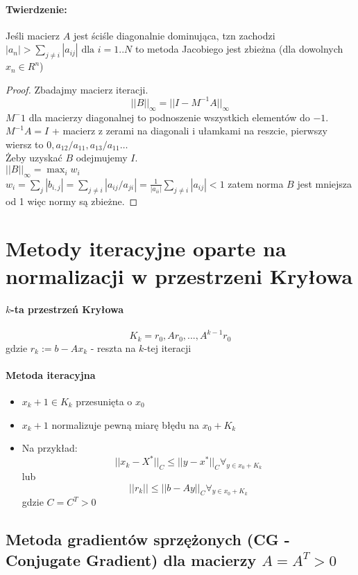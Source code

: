 \documentclass{article}
\begin{document}
\paragraph{Twierdzenie:} Jeśli macierz $ A $ jest ściśle diagonalnie dominująca, tzn zachodzi
$ |a_n|>\sum_{j\not=i}|a_{ij}|\text{ dla }i=1..N $
 to metoda Jacobiego jest zbieżna (dla dowolnych $ x_n\in R^n $)
\begin{proof}
	Zbadajmy macierz iteracji.
	$$ ||B||_\infty = ||I-M^{-1}A||_\infty $$
	$ M^-1 $ dla macierzy diagonalnej to podnoszenie wszystkich elementów do $ -1 $.\\
	$ M^{-1}A=I $ + macierz z zerami na diagonali i ułamkami na reszcie, pierwszy wiersz to $ 0, a_{12}/a_{11}, a_{13}/a_{11}\ldots $\\
	Żeby uzyskać $ B $ odejmujemy $I$.\\
	$ ||B||_\infty = \max_i w_i  $\\
	$ w_i = \sum_j |b_{i,j}|=\sum_{j\not=i}|a_{ij}/a_{ji}|=\frac1{|a_{ii}|}\sum_{j\not=i}|a_{ij}|<1 $
	zatem norma $ B $ jest mniejsza od 1 więc normy są zbieżne.
\end{proof}

\section{Metody iteracyjne oparte na normalizacji w przestrzeni Kryłowa}
\paragraph{$k$-ta przestrzeń Kryłowa}
$$ K_k = {r_0, Ar_0, ...,A^{k-1}  r_0} $$ 
gdzie $ r_k:=b-Ax_k $ - reszta na $ k $-tej iteracji
\paragraph{Metoda iteracyjna}
\begin{itemize}
	\item $ x_k+1 \in K_k $ przesunięta o $ x_0 $
	\item $ x_k+1 $ normalizuje pewną miarę błędu na $ x_0+K_k $
	\item Na przykład: $$ ||x_k-X^*||_C\leq ||y-x^*||_C \forall_{y\in x_0+K_k} $$
	lub $$ ||r_k||\leq ||b-Ay||_C \forall_{y\in x_0+K_k} $$
	gdzie $ C =C^T>0 $
\end{itemize}

\subsection{Metoda gradientów sprzężonych (CG - Conjugate Gradient) dla macierzy $A=A^T>0$}
\end{document}

